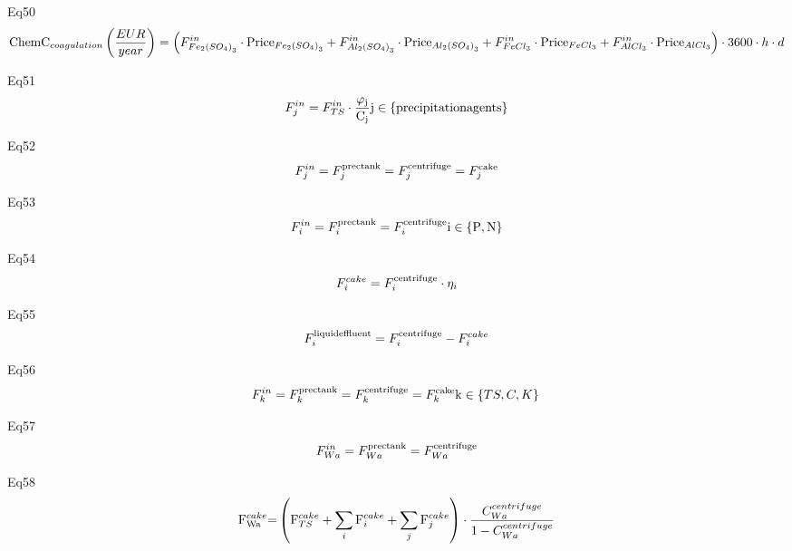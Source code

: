 \documentclass[10pt,a4paper]{article}
\begin{document}
Eq50
\begin{align}
	{\rm{ChemC}}_{coagulation}\left( \frac{EUR }{{year}} \right) = \left( {F_{F{e_2}{{\left( {S{O_4}} \right)}_3}}^{in} \cdot {\rm{Pric}}{{\rm{e}}_{F{e_2}{{\left( {S{O_4}} \right)}_3}}} + F_{A{l_2}{{\left( {S{O_4}} \right)}_3}}^{in} \cdot {\rm{Pric}}{{\rm{e}}_{A{l_2}{{\left( {S{O_4}} \right)}_3}}} + F_{FeC{l_3}}^{in} \cdot {\rm{Pric}}{{\rm{e}}_{FeC{l_3}}} + F_{AlC{l_3}}^{in} \cdot {\rm{Pric}}{{\rm{e}}_{AlC{l_3}}}} \right)\cdot3600\cdot h \cdot d
\end{align}

Eq51
\begin{align}
	F_j^{in} = F_{TS}^{in} \cdot \frac{{{{\rm{\varphi }}_{\rm{j}}}}}{{{{\rm{C}}_{\rm{j}}}}}{\rm{   j}} \in \left\{ {{\rm{precipitation agents}}} \right\}
\end{align}

Eq52
\begin{align}
	F_j^{in} = F_j^{{\rm{prec tank}}} = F_j^{{\rm{centrifuge}}} = F_j^{{\rm{cake}}}
\end{align}

Eq53
\begin{align}
	F_i^{in} = F_i^{{\rm{prec tank}}} = F_i^{{\rm{centrifuge}}}{\rm{   i}} \in \left\{ {{\rm{P,N}}} \right\}
\end{align}

Eq54
\begin{align}
	F_i^{cake} = F_i^{{\rm{centrifuge}}} \cdot {\eta _i}{\rm{ }}
\end{align}

Eq55
\begin{align}
	F_i^{{\rm{liquid effluent}}} = F_i^{{\rm{centrifuge}}} - F_i^{cake}
\end{align}

Eq56
\begin{align}
	F_k^{in} = F_k^{{\rm{prec tank}}} = F_k^{{\rm{centrifuge}}} = F_k^{{\rm{cake}}}{\rm{   k}} \in \left\{ {TS,C,K} \right\}{\rm{ }}
\end{align}

Eq57
\begin{align}
	F_{Wa}^{in} = F_{Wa}^{{\rm{prec tank}}} = F_{Wa}^{{\rm{centrifuge}}}
\end{align}

Eq58
\begin{align}
	{\rm{F}}_{{\rm{Wa}}}^{cake}{\rm{ = }}\left( {{\rm{F}}_{TS}^{cake} + \sum\limits_i {{\rm{F}}_i^{cake} + \sum\limits_j {{\rm{F}}_j^{cake}} } } \right) \cdot \frac{{C_{Wa}^{centrifuge}}}{{1 - C_{Wa}^{centrifuge}}}
\end{align}
\end{document}
